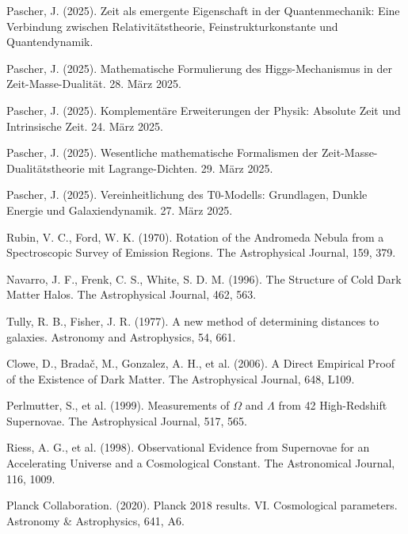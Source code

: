 \documentclass[a4paper,12pt]{article}
\begin{document}
	\begin{thebibliography}{99}
		
		 Pascher, J. (2025). Zeit als emergente Eigenschaft in der Quantenmechanik: Eine Verbindung zwischen Relativitätstheorie, Feinstrukturkonstante und Quantendynamik.
		
		 Pascher, J. (2025). Mathematische Formulierung des Higgs-Mechanismus in der Zeit-Masse-Dualität. 28. März 2025.
		
		 Pascher, J. (2025). Komplementäre Erweiterungen der Physik: Absolute Zeit und Intrinsische Zeit. 24. März 2025.
		
		 Pascher, J. (2025). Wesentliche mathematische Formalismen der Zeit-Masse-Dualitätstheorie mit Lagrange-Dichten. 29. März 2025.
		
		 Pascher, J. (2025). Vereinheitlichung des T0-Modells: Grundlagen, Dunkle Energie und Galaxiendynamik. 27. März 2025.
		
		 Rubin, V. C., Ford, W. K. (1970). Rotation of the Andromeda Nebula from a Spectroscopic Survey of Emission Regions. The Astrophysical Journal, 159, 379.
		
		 Navarro, J. F., Frenk, C. S., White, S. D. M. (1996). The Structure of Cold Dark Matter Halos. The Astrophysical Journal, 462, 563.
		
		 Tully, R. B., Fisher, J. R. (1977). A new method of determining distances to galaxies. Astronomy and Astrophysics, 54, 661.
		
		 Clowe, D., Bradač, M., Gonzalez, A. H., et al. (2006). A Direct Empirical Proof of the Existence of Dark Matter. The Astrophysical Journal, 648, L109.
		
		 Perlmutter, S., et al. (1999). Measurements of $\Omega$ and $\Lambda$ from 42 High-Redshift Supernovae. The Astrophysical Journal, 517, 565.
		
		 Riess, A. G., et al. (1998). Observational Evidence from Supernovae for an Accelerating Universe and a Cosmological Constant. The Astronomical Journal, 116, 1009.
		
		 Planck Collaboration. (2020). Planck 2018 results. VI. Cosmological parameters. Astronomy \& Astrophysics, 641, A6.
		
	\end{thebibliography}
	
\end{document}
